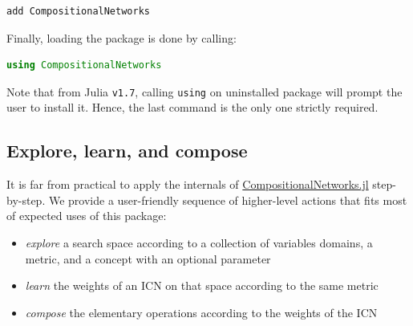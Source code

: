 \documentclass{juliacon}
\newcommand{\cnjl}{\href{https://github.com/JuliaConstraints/CompositionalNetworks.jl}{CompositionalNetworks.jl}\xspace}
\begin{document}
\begin{lstlisting}
add CompositionalNetworks
\end{lstlisting}

Finally, loading the package is done by calling:
\begin{lstlisting}[language = Julia]
using CompositionalNetworks
\end{lstlisting}

Note that from Julia \texttt{v1.7}, calling \texttt{using} on uninstalled package will prompt the user to install it. Hence, the last command is the only one strictly required.

\subsection{Explore, learn, and compose}
\label{subsec:xlc}

It is far from practical to apply the internals of \cnjl step-by-step. We provide a user-friendly sequence of higher-level actions that fits most of expected uses of this package:
\begin{itemize}
  \item \emph{explore} a search space according to a collection of variables domains, a metric, and a concept with an optional parameter
  \item \emph{learn} the weights of an ICN on that space according to the same metric
  \item \emph{compose} the elementary operations according to the weights of the ICN
\end{itemize}
\end{document}
